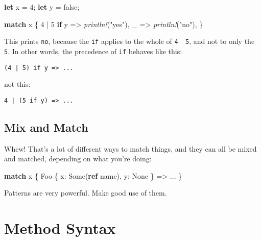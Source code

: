 \documentclass[a4paper,]{book}
\newenvironment{Shaded}{\begin{snugshade}}{\end{snugshade}}
\newcommand{\KeywordTok}[1]{\textcolor[rgb]{0.13,0.29,0.53}{\textbf{{#1}}}}
\newcommand{\DecValTok}[1]{\textcolor[rgb]{0.00,0.00,0.81}{{#1}}}
\newcommand{\ConstantTok}[1]{\textcolor[rgb]{0.00,0.00,0.00}{{#1}}}
\newcommand{\StringTok}[1]{\textcolor[rgb]{0.31,0.60,0.02}{{#1}}}
\newcommand{\PreprocessorTok}[1]{\textcolor[rgb]{0.56,0.35,0.01}{\textit{{#1}}}}
\newcommand{\NormalTok}[1]{{#1}}
\begin{document}
\begin{Shaded}
\begin{Highlighting}[]
\KeywordTok{let} \NormalTok{x = }\DecValTok{4}\NormalTok{;}
\KeywordTok{let} \NormalTok{y = }\ConstantTok{false}\NormalTok{;}

\KeywordTok{match} \NormalTok{x \{}
    \DecValTok{4} \NormalTok{| }\DecValTok{5} \KeywordTok{if} \NormalTok{y => }\PreprocessorTok{println!}\NormalTok{(}\StringTok{"yes"}\NormalTok{),}
    \NormalTok{_ => }\PreprocessorTok{println!}\NormalTok{(}\StringTok{"no"}\NormalTok{),}
\NormalTok{\}}
\end{Highlighting}
\end{Shaded}

This prints \texttt{no}, because the \texttt{if} applies to the whole of
\texttt{4\ \textbar{}\ 5}, and not to only the \texttt{5}. In other
words, the precedence of \texttt{if} behaves like this:

\begin{verbatim}
(4 | 5) if y => ...
\end{verbatim}

not this:

\begin{verbatim}
4 | (5 if y) => ...
\end{verbatim}

\subsection{Mix and Match}\label{mix-and-match}

Whew! That's a lot of different ways to match things, and they can all
be mixed and matched, depending on what you're doing:

\begin{Shaded}
\begin{Highlighting}[]
\KeywordTok{match} \NormalTok{x \{}
    \NormalTok{Foo \{ x: }\ConstantTok{Some}\NormalTok{(}\KeywordTok{ref} \NormalTok{name), y: }\ConstantTok{None} \NormalTok{\} => ...}
\NormalTok{\}}
\end{Highlighting}
\end{Shaded}

Patterns are very powerful. Make good use of them.

\hypertarget{sec--method-syntax}{\section{Method
Syntax}\label{sec--method-syntax}}
\end{document}

